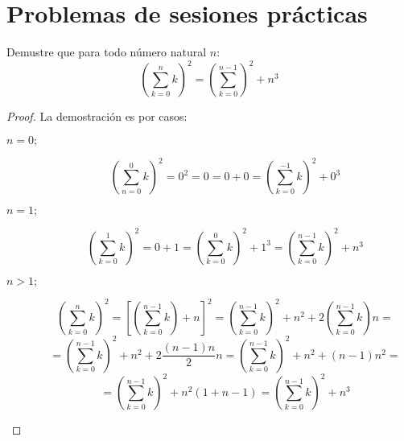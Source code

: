 \section{Problemas de sesiones prácticas}

\begin{ejercicio}
    Demustre que para todo número natural $n$:
    $$\left(\sum_{k=0}^n k\right)^2 = \left(\sum_{k=0}^{n-1}\right)^2 + n^3$$
\end{ejercicio}
\begin{proof}
    La demostración es por casos:
    \begin{description}
        \item [$n = 0;$]
            $$\left(\sum_{n=0}^0 k\right)^2 = 0^2 = 0 = 0+0 = \left(\sum_{k=0}^{-1}k\right)^2 + 0^3$$
        \item [$n = 1;$]
            $$\left(\sum_{k=0}^1 k\right)^2 = 0+1 = \left(\sum_{k=0}^0 k\right)^2 + 1^3 = \left(\sum_{k=0}^{n-1} k\right)^2 + n^3$$
        \item [$n > 1;$]
            $$\left(\sum_{k=0}^n k\right)^2 = \left[\left(\sum_{k=0}^{n-1} k\right) + n\right]^2 = \left(\sum_{k=0}^{n-1}k\right)^2 + n^2 + 2\left(\sum_{k=0}^{n-1} k\right)n =$$
            $$= \left(\sum_{k=0}^{n-1}k\right)^2 + n^2 + 2 \dfrac{(n-1)n}{2} n = \left(\sum_{k=0}^{n-1}k\right)^2 + n^2 + (n-1)n^2 =$$ 
            $$= \left(\sum_{k=0}^{n-1}k\right)^2 + n^2 (1+n-1) = \left(\sum_{k=0}^{n-1}k\right)^2 + n^3$$
    \end{description}
\end{proof}


